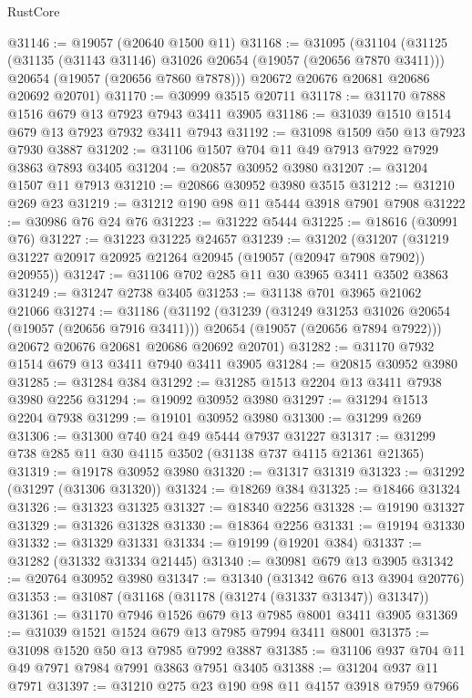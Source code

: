 \begin{lexlean}{RustCore}
\begin{coremodule}
@31146 := @19057 (@20640 @1500 @11)
@31168 := @31095
    (@31104
      (@31125
        (@31135 (@31143 @31146) @31026 @20654 (@19057 (@20656 @7870 @3411)))
        @20654
        (@19057 (@20656 @7860 @7878)))
      @20672
      @20676
      @20681
      @20686
      @20692
      @20701)
@31170 := @30999 @3515 @20711
@31178 := @31170 @7888 @1516 @679 @13 @7923 @7943 @3411 @3905
@31186 := @31039 @1510 @1514 @679 @13 @7923 @7932 @3411 @7943
@31192 := @31098 @1509 @50 @13 @7923 @7930 @3887
@31202 := @31106 @1507 @704 @11 @49 @7913 @7922 @7929 @3863 @7893 @3405
@31204 := @20857 @30952 @3980
@31207 := @31204 @1507 @11 @7913
@31210 := @20866 @30952 @3980 @3515
@31212 := @31210 @269 @23
@31219 := @31212 @190 @98 @11 @5444 @3918 @7901 @7908
@31222 := @30986 @76 @24 @76
@31223 := @31222 @5444
@31225 := @18616 (@30991 @76)
@31227 := @31223 @31225 @24657
@31239 := @31202
    (@31207 (@31219 @31227 @20917 @20925 @21264 @20945 (@19057 (@20947 @7908 @7902)) @20955))
@31247 := @31106 @702 @285 @11 @30 @3965 @3411 @3502 @3863
@31249 := @31247 @2738 @3405
@31253 := @31138 @701 @3965 @21062 @21066
@31274 := @31186
    (@31192
      (@31239
        (@31249 @31253 @31026 @20654 (@19057 (@20656 @7916 @3411)))
        @20654
        (@19057 (@20656 @7894 @7922)))
      @20672
      @20676
      @20681
      @20686
      @20692
      @20701)
@31282 := @31170 @7932 @1514 @679 @13 @3411 @7940 @3411 @3905
@31284 := @20815 @30952 @3980
@31285 := @31284 @384
@31292 := @31285 @1513 @2204 @13 @3411 @7938 @3980 @2256
@31294 := @19092 @30952 @3980
@31297 := @31294 @1513 @2204 @7938
@31299 := @19101 @30952 @3980
@31300 := @31299 @269
@31306 := @31300 @740 @24 @49 @5444 @7937 @31227
@31317 := @31299 @738 @285 @11 @30 @4115 @3502 (@31138 @737 @4115 @21361 @21365)
@31319 := @19178 @30952 @3980
@31320 := @31317 @31319
@31323 := @31292 (@31297 (@31306 @31320))
@31324 := @18269 @384
@31325 := @18466 @31324
@31326 := @31323 @31325
@31327 := @18340 @2256
@31328 := @19190 @31327
@31329 := @31326 @31328
@31330 := @18364 @2256
@31331 := @19194 @31330
@31332 := @31329 @31331
@31334 := @19199 (@19201 @384)
@31337 := @31282 (@31332 @31334 @21445)
@31340 := @30981 @679 @13 @3905
@31342 := @20764 @30952 @3980
@31347 := @31340 (@31342 @676 @13 @3904 @20776)
@31353 := @31087 (@31168 (@31178 (@31274 (@31337 @31347)) @31347))
@31361 := @31170 @7946 @1526 @679 @13 @7985 @8001 @3411 @3905
@31369 := @31039 @1521 @1524 @679 @13 @7985 @7994 @3411 @8001
@31375 := @31098 @1520 @50 @13 @7985 @7992 @3887
@31385 := @31106 @937 @704 @11 @49 @7971 @7984 @7991 @3863 @7951 @3405
@31388 := @31204 @937 @11 @7971
@31397 := @31210 @275 @23 @190 @98 @11 @4157 @3918 @7959 @7966

\end{coremodule}
\end{lexlean}
